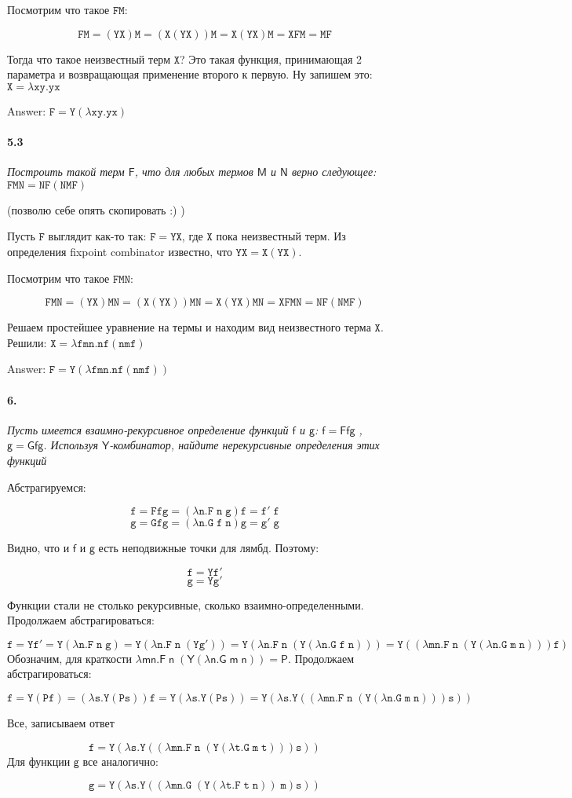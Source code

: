 \documentclass[russian]{article}
\begin{document}
Посмотрим что такое $\mathtt{FM}$: 

\[
\mathtt{FM = (YX)M = (X(YX))M = X(YX)M = XFM = MF}
\]

Тогда что такое неизвестный терм $\mathtt{X}$? Это такая функция, принимающая 2 параметра и возвращающая применение второго к первую. Ну запишем это: $\mathtt{X = \lambda xy.yx}$

Answer: $\mathtt{F = Y(\lambda xy.yx)}$

\paragraph*{5.3} \textit{Построить такой терм $\mathsf{F}$, что для любых термов $\mathsf{M}$ и $\mathsf{N}$ верно следующее: $\mathtt{FMN = NF(NMF)}$}

(позволю себе опять скопировать :) )

Пусть $\mathtt{F}$ выглядит как-то так: $\mathtt{F = YX}$, где $\mathtt{X}$ пока неизвестный терм. Из определения fixpoint combinator известно, что $\mathtt{YX = X(YX)}$.

Посмотрим что такое $\mathtt{FMN}$: 

\[
\mathtt{FMN = (YX)MN = (X(YX))MN = X(YX)MN = XFMN = NF(NMF)}
\]

Решаем простейшее уравнение на термы и находим вид неизвестного терма $\mathtt{X}$. Решили: $\mathtt{X = \lambda fmn.nf(nmf)}$

Answer: $\mathtt{F = Y(\lambda fmn.nf(nmf))}$

\paragraph*{6.} \textit{Пусть имеется взаимно-рекурсивное определение функций $\mathsf{f}$ и $\mathsf{g}$: $\mathsf{f = Ffg}$ , $\mathsf{g = Gfg}$. Используя $\mathsf{Y}$-комбинатор, найдите нерекурсивные определения этих функций}

Абстрагируемся:

\[
\mathtt{f = Ffg = (\lambda n.F\;n\;g)f = f'\;f}
\]
\[
\mathtt{g = Gfg = (\lambda n.G\;f\;n)g = g'\;g}
\]

Видно, что и $\mathsf{f}$ и $\mathsf{g}$ есть неподвижные точки для лямбд. Поэтому:

\[
\mathtt{f = Yf'}
\]
\[
\mathtt{g = Yg'}
\]

Функции стали не столько рекурсивные, сколько взаимно-определенными. Продолжаем абстрагироваться:

\[
\mathtt{f = Yf' = Y(\lambda n.F\;n\;g) = Y(\lambda n.F\;n\;(Yg')) = Y(\lambda n.F\;n\;(Y(\lambda n.G\;f\;n))) = Y((\lambda mn.F\;n\;(Y(\lambda n.G\;m\;n)))f)}
\]
Обозначим, для краткости $\mathsf{\lambda mn.F\;n\;(Y(\lambda n.G\;m\;n)) = P}$. Продолжаем абстрагироваться:

\[
\mathtt{f = Y(Pf) = (\lambda s.Y(Ps))f = Y(\lambda s.Y(Ps)) = Y(\lambda s.Y((\lambda mn.F\;n\;(Y(\lambda n.G\;m\;n)))s))}
\]

Все, записываем ответ

\[
\mathtt{f = Y(\lambda s.Y((\lambda mn.F\;n\;(Y(\lambda t.G\;m\;t)))s))}
\]
Для функции $\mathsf{g}$ все аналогично: 

\[
\mathtt{g = Y(\lambda s.Y((\lambda mn.G\;(Y(\lambda t.F\;t\;n))\;m)s))}
\]
\end{document}
